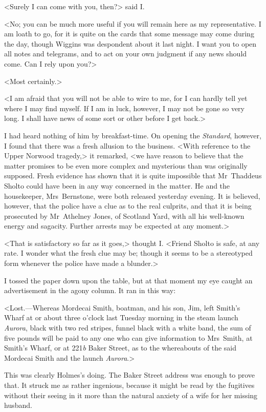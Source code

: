 <Surely I can come with you, then?> said I\@.

<No; you can be much more useful if you will remain here as my representative. I am loath to go, for it is quite on the cards that some message may come during the day, though Wiggins was despondent about it last night. I want you to open all notes and telegrams, and to act on your own judgment if any news should come. Can I rely upon you?>

<Most certainly.>

<I am afraid that you will not be able to wire to me, for I can hardly tell yet where I may find myself. If I am in luck, however, I may not be gone so very long. I shall have news of some sort or other before I get back.>

I had heard nothing of him by breakfast-time. On opening the \textit{Standard}, however, I found that there was a fresh allusion to the business. <With reference to the Upper Norwood tragedy,> it remarked, <we have reason to believe that the matter promises to be even more complex and mysterious than was originally supposed. Fresh evidence has shown that it is quite impossible that Mr~Thaddeus Sholto could have been in any way concerned in the matter. He and the housekeeper, Mrs~Bernstone, were both released yesterday evening. It is believed, however, that the police have a clue as to the real culprits, and that it is being prosecuted by Mr~Athelney Jones, of Scotland Yard, with all his well-known energy and sagacity. Further arrests may be expected at any moment.>

<That is satisfactory so far as it goes,> thought I\@. <Friend Sholto is safe, at any rate. I wonder what the fresh clue may be; though it seems to be a stereotyped form whenever the police have made a blunder.>

I tossed the paper down upon the table, but at that moment my eye caught an advertisement in the agony column. It ran in this way:

<Lost.—Whereas Mordecai Smith, boatman, and his son, Jim, left Smith's Wharf at or about three o'clock last Tuesday morning in the steam launch \textit{Aurora}, black with two red stripes, funnel black with a white band, the sum of five pounds will be paid to any one who can give information to Mrs~Smith, at Smith's Wharf, or at 221\textit{b} Baker Street, as to the whereabouts of the said Mordecai Smith and the launch \textit{Aurora}.>

This was clearly Holmes's doing. The Baker Street address was enough to prove that. It struck me as rather ingenious, because it might be read by the fugitives without their seeing in it more than the natural anxiety of a wife for her missing husband.

